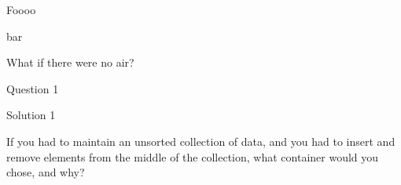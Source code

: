 \documentclass[10pt,addpoints]{exam}
\begin{document}
\begin{questions}
\par\vspace{0.100000in}\begin{minipage}{\linewidth}
\question[10]

Foooo

\begin{solutionbox}{3in}

bar
\end{solutionbox}
\end{minipage}


\par\vspace{0.100000in}\begin{minipage}{\linewidth}
\question What if there were no air?
\end{minipage}


\par\vspace{0.100000in}\begin{minipage}{\linewidth}
\question[8]
Question 1
\begin{solutionbox}{0in}
Solution 1
\end{solutionbox}
\end{minipage}


\par\vspace{0.100000in}\begin{minipage}{\linewidth}
\question[10]

If you had to maintain an unsorted collection of data, and you had to insert
and remove elements from the middle of the collection, what container would
you chose, and why?


\end{minipage}
\end{questions}
\end{document}
